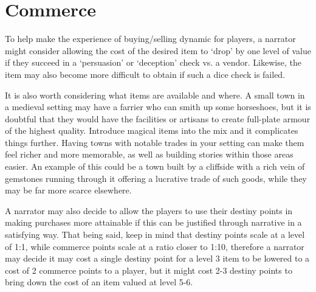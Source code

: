 \section{Commerce}

To help make the experience of buying/selling dynamic for players, a narrator might consider allowing the cost of the desired item to ‘drop’ by one level of value if they succeed in a ‘persuasion’ or ‘deception’ check vs. a vendor. Likewise, the item may also become more difficult to obtain if such a dice check is failed.

It is also worth considering what items are available and where. A small town in a medieval setting may have a farrier who can smith up some horseshoes, but it is doubtful that they would have the facilities or artisans to create full-plate armour of the highest quality. Introduce magical items into the mix and it complicates things further. Having towns with notable trades in your setting can make them feel richer and more memorable, as well as building stories within those areas easier. An example of this could be a town built by a cliffside with a rich vein of gemstones running through it offering a lucrative trade of such goods, while they may be far more scarce elsewhere.

A narrator may also decide to allow the players to use their destiny points in making purchases more attainable if this can be justified through narrative in a satisfying way. That being said, keep in mind that destiny points scale at a level of 1:1, while commerce points scale at a ratio closer to 1:10, therefore a narrator may decide it may cost a single destiny point for a level 3 item to be lowered to a cost of 2 commerce points to a player, but it might cost 2-3 destiny points to bring down the cost of an item valued at level 5-6.